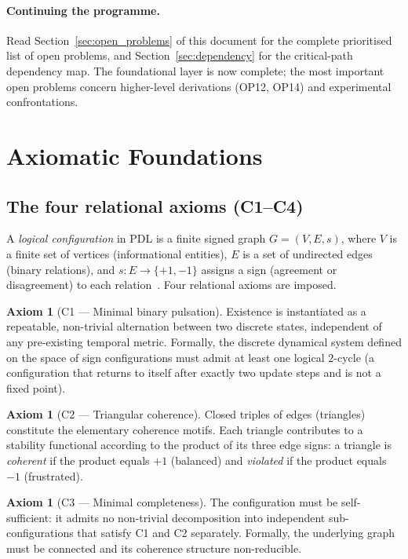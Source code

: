 \documentclass[11pt,a4paper]{article}
\theoremstyle{plain}
\theoremstyle{definition}
\newtheorem{axiom}[theorem]{Axiom}
\theoremstyle{remark}
\begin{document}
\paragraph{Continuing the programme.}
Read Section~\ref{sec:open_problems} of this document for the complete prioritised list of open problems, and Section~\ref{sec:dependency} for the critical-path dependency map. The foundational layer is now complete; the most important open problems concern higher-level derivations (OP12, OP14) and experimental confrontations.

\section{Axiomatic Foundations}
\label{sec:axioms}

\subsection{The four relational axioms (C1--C4)}
\label{subsec:axioms}

A \emph{logical configuration} in PDL is a finite signed graph $G=(V,E,s)$, where $V$ is a finite set of vertices (informational entities), $E$ is a set of undirected edges (binary relations), and $s\colon E\to\{+1,-1\}$ assigns a sign (agreement or disagreement) to each relation~\citep{D01,D02}.
Four relational axioms are imposed.

\begin{axiom}[C1 — Minimal binary pulsation]
Existence is instantiated as a repeatable, non-trivial alternation between two discrete states, independent of any pre-existing temporal metric.
Formally, the discrete dynamical system defined on the space of sign configurations must admit at least one logical $2$-cycle (a configuration that returns to itself after exactly two update steps and is not a fixed point).
\end{axiom}

\begin{axiom}[C2 — Triangular coherence]
Closed triples of edges (triangles) constitute the elementary coherence motifs.
Each triangle contributes to a stability functional according to the product of its three edge signs: a triangle is \emph{coherent} if the product equals $+1$ (balanced) and \emph{violated} if the product equals $-1$ (frustrated).
\end{axiom}

\begin{axiom}[C3 — Minimal completeness]
The configuration must be self-sufficient: it admits no non-trivial decomposition into independent sub-configurations that satisfy C1 and C2 separately.
Formally, the underlying graph must be connected and its coherence structure non-reducible.
\end{axiom}
\end{document}
